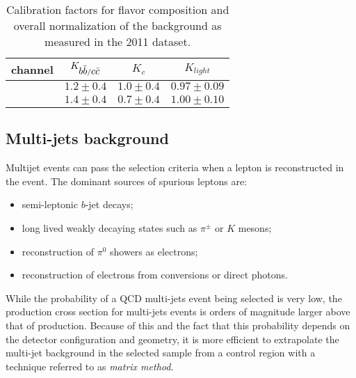 \begin{table}
  \caption{Calibration factors for flavor composition and overall
    normalization of the \wjets{} background as measured in the 2011 dataset.}
  \label{tab:wsf}
  \centering
  \begin{tabular}{lccc}
    \toprule
    channel   & $K_{\mbox{$b\bar{b}$}{}/\mbox{$c\bar{c}$}{}}$   & $K_{c}$       &
    $K_{light}$ \\
    \midrule
    \mujets{}  & $1.2\pm0.4$            & $1.0\pm0.4$ &
    $0.97\pm0.09$\\ 
    \ejets{}    & $1.4\pm0.4$            & $0.7\pm0.4$ &
    $1.00\pm0.10$\\ 
    \bottomrule
  \end{tabular}
\end{table}

\subsection{Multi-jets background}
\label{sec:qcdbckg}

Multijet events can pass the selection criteria when a lepton is
reconstructed in the event. The dominant sources of spurious leptons
are:
\begin{itemize}
\item semi-leptonic $b$-jet decays;
\item long lived weakly decaying states such as $\pi^{\pm}$ or $K$
  mesons;
\item reconstruction of $\pi^0$ showers as electrons;
\item reconstruction of electrons from conversions or direct photons.
\end{itemize}

While the probability of a QCD multi-jets event being selected is very
low, the production cross section for multi-jets events is orders of
magnitude larger above that of \ttbar{} production.
Because of this and the fact that this probability depends on the
detector configuration and geometry, it is more efficient to
extrapolate the multi-jet background in the selected sample from a
control region with a technique referred to as {\it matrix method}.

